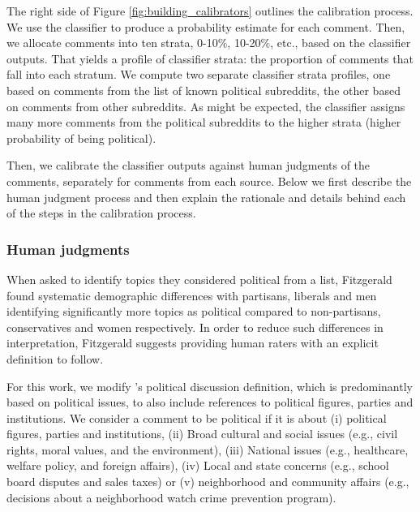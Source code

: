 \documentclass[letterpaper]{article} %
\begin{document}
The right side of Figure \ref{fig:building_calibrators} outlines the calibration process. We use the classifier to produce a probability estimate for each comment. Then, we allocate comments into ten strata, 0-10\%, 10-20\%, etc., based on the classifier outputs. That yields a profile of classifier strata: the proportion of comments that fall into each stratum. We compute two separate classifier strata profiles, one based on comments from the list of known political subreddits, the other based on comments from other subreddits. As might be expected, the classifier assigns many more comments from the political subreddits to the higher strata (higher probability of being political).

Then, we calibrate the classifier outputs against human judgments of the comments, separately for comments from each source. Below we first describe the human judgment process and then explain the rationale and details behind each of the steps in the calibration process.

\subsubsection{Human judgments}
When asked to identify topics they considered political from a list, Fitzgerald \citeyearpar{fitzgerald2013does} found systematic demographic differences with partisans, liberals and men identifying significantly more topics as political compared to non-partisans, conservatives and women respectively. In order to reduce such differences in interpretation, Fitzgerald suggests providing human raters with an explicit definition to follow.

For this work, we modify \cite{moy2006predicting}'s political discussion definition, which is predominantly based on political issues, to also include references to political figures, parties and institutions. We consider a comment to be political if it is about (i) political figures, parties and institutions, (ii) Broad cultural and social issues (e.g., civil rights, moral values, and the environment), (iii) National issues (e.g., healthcare, welfare policy, and foreign affairs), (iv) Local and state concerns (e.g., school board disputes and sales taxes) or (v) neighborhood and community affairs (e.g., decisions about a neighborhood watch crime prevention program).
\end{document}
